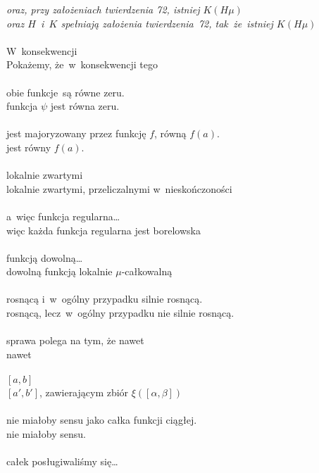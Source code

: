 \documentclass[a4paper,11pt]{article}
\numberwithin{equation}{section}
\begin{document}
\Jest \textit{oraz, przy założeniach twierdzenia 72, istniej
  $K( H \mu )$} \\
\Powin \textit{oraz $H$~i~$K$ spełniają założenia twierdzenia~72,
  tak~że~istniej $K( H \mu )$}\\
 \\
\Jest  W~konsekwencji \\
\Powin Pokażemy, że~w~konsekwencji tego \\
 \\
\Jest  obie funkcje~są równe zeru. \\
\Powin funkcja $\psi$ jest równa zeru. \\
 \\
\Jest  jest majoryzowany przez funkcję $f$, równą $f( a )$. \\
\Powin jest równy $f( a )$.\\
 \\
\Jest  lokalnie zwartymi \\
\Powin lokalnie zwartymi, przeliczalnymi w~nieskończoności \\
 \\
\Jest  a~więc funkcja regularna\ldots \\
\Powin więc każda funkcja regularna jest borelowska \\
 \\
\Jest  funkcją dowolną\ldots \\
\Powin dowolną funkcją lokalnie $\mu$-całkowalną \\
 \\
\Jest  rosnącą i~w~ogólny przypadku silnie rosnącą. \\
\Powin rosnącą, lecz~w~ogólny przypadku nie silnie rosnącą. \\
 \\
\Jest  sprawa polega na tym, że nawet \\
\Powin nawet \\
 \\
\Jest $[ a, b ]$ \\
\Powin  $[ a', b' ]$, zawierającym zbiór $\xi( [ \alpha, \beta ] )$ \\
 \\
\Jest  nie miałoby sensu jako całka funkcji ciągłej. \\
\Powin nie miałoby sensu. \\
 \\
\Jest  całek posługiwaliśmy się\ldots \\
\end{document}
